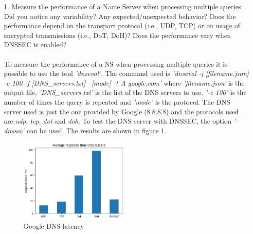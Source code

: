 \documentclass[a4paper,10pt]{article}
\begin{document}
\begin{multicols}{2}
1. Measure the performance of a Name Server when processing multiple queries. Did you notice any variability? Any expected/unexpected behavior? Does the 
performance depend on the transport protocol (i.e., UDP, TCP) or on usage of encrypted transmissions (i.e., DoT, DoH)? Does the performance vary when DNSSEC is enabled?\\
\\
To measure the performance of a NS when processing multiple queries it is possible to use the tool \textit{'dnseval'}. 
The command used is \textit{'dnseval -j [filename.json] -c 100 -f [DNS\_servers.txt] --[mode] -t A google.com'}
where \textit{'filename.json'} is the output file, \textit{'DNS\_servers.txt'} is the list of the DNS servers to use, \textit{'-c 100'} is the number of times the query 
is repeated and \textit{'mode'} is the protocol. The DNS server used is just the one provided by Google (8.8.8.8) and the 
protocols used are \textit{udp}, \textit{tcp}, \textit{dot} and \textit{doh}. To test the DNS server with DNSSEC, the option \textit{'--dnssec'} can be used.
The results are shown in figure \ref{fig:latency_8888}.\\

        \begin{figure}[H]
                \centering
                \includegraphics[width = 0.49\textwidth]{latency_8888.png}
                \caption{\small Google DNS latency}
                \label{fig:latency_8888}
        \end{figure}


\end{multicols}
\end{document}
